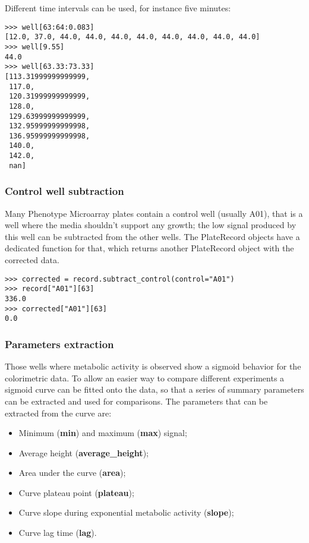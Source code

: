 Different time intervals can be used, for instance five minutes:
\begin{verbatim}
>>> well[63:64:0.083]
[12.0, 37.0, 44.0, 44.0, 44.0, 44.0, 44.0, 44.0, 44.0, 44.0]
>>> well[9.55]
44.0
>>> well[63.33:73.33]
[113.31999999999999,
 117.0,
 120.31999999999999,
 128.0,
 129.63999999999999,
 132.95999999999998,
 136.95999999999998,
 140.0,
 142.0,
 nan]
\end{verbatim}

\subsubsection{Control well subtraction}
Many Phenotype Microarray plates contain a control well (usually A01), that is a well where the media shouldn't support
any growth; the low signal produced by this well can be subtracted from the other wells.
The PlateRecord objects have a dedicated function for that, which returns another PlateRecord object
with the corrected data.

\begin{verbatim}
>>> corrected = record.subtract_control(control="A01")
>>> record["A01"][63]
336.0
>>> corrected["A01"][63]
0.0
\end{verbatim}

\subsubsection{Parameters extraction}
Those wells where metabolic activity is observed show a sigmoid behavior for the colorimetric data.
To allow an easier way to compare different experiments a sigmoid curve can be fitted onto the data,
so that a series of summary parameters can be extracted and used for comparisons.
The parameters that can be extracted from the curve are:

\begin{itemize}
  \item Minimum (\textbf{min}) and maximum (\textbf{max}) signal;

  \item Average height (\textbf{average\_height});

  \item Area under the curve (\textbf{area});

  \item Curve plateau point (\textbf{plateau});

  \item Curve slope during exponential metabolic activity (\textbf{slope});

  \item Curve lag time (\textbf{lag}).
\end{itemize}

